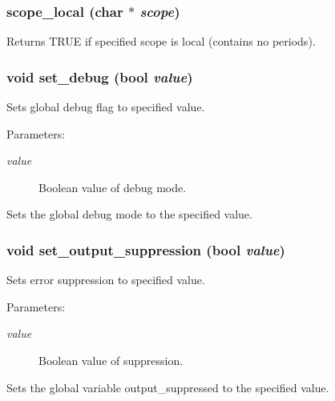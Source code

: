 \subsubsection{ scope\_\-local (char $\ast$ {\em scope})}\label{util_8h_a11}


Returns TRUE if specified scope is local (contains no periods).

\subsubsection{\setlength{\rightskip}{0pt plus 5cm}void set\_\-debug ({\bf bool} {\em value})}\label{util_8h_a1}


Sets global debug flag to specified value.

\begin{Desc}
\item[Parameters:]
\begin{description}
\item[{\em value}]Boolean value of debug mode.\end{description}
\end{Desc}
Sets the global debug mode to the specified value. 
\subsubsection{\setlength{\rightskip}{0pt plus 5cm}void set\_\-output\_\-suppression ({\bf bool} {\em value})}\label{util_8h_a0}


Sets error suppression to specified value.

\begin{Desc}
\item[Parameters:]
\begin{description}
\item[{\em value}]Boolean value of suppression.\end{description}
\end{Desc}
Sets the global variable output\_\-suppressed to the specified value. 
